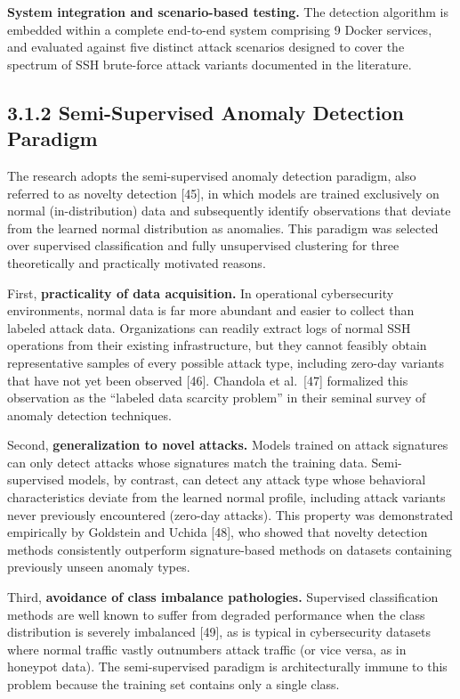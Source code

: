 \documentclass[
  a4paper]{report}
\begin{document}
\textbf{System integration and scenario-based testing.} The detection
algorithm is embedded within a complete end-to-end system comprising 9
Docker services, and evaluated against five distinct attack scenarios
designed to cover the spectrum of SSH brute-force attack variants
documented in the literature.

\subsection{3.1.2 Semi-Supervised Anomaly Detection
Paradigm}\label{semi-supervised-anomaly-detection-paradigm}

The research adopts the semi-supervised anomaly detection paradigm, also
referred to as novelty detection {[}45{]}, in which models are trained
exclusively on normal (in-distribution) data and subsequently identify
observations that deviate from the learned normal distribution as
anomalies. This paradigm was selected over supervised classification and
fully unsupervised clustering for three theoretically and practically
motivated reasons.

First, \textbf{practicality of data acquisition.} In operational
cybersecurity environments, normal data is far more abundant and easier
to collect than labeled attack data. Organizations can readily extract
logs of normal SSH operations from their existing infrastructure, but
they cannot feasibly obtain representative samples of every possible
attack type, including zero-day variants that have not yet been observed
{[}46{]}. Chandola et al.~{[}47{]} formalized this observation as the
``labeled data scarcity problem'' in their seminal survey of anomaly
detection techniques.

Second, \textbf{generalization to novel attacks.} Models trained on
attack signatures can only detect attacks whose signatures match the
training data. Semi-supervised models, by contrast, can detect any
attack type whose behavioral characteristics deviate from the learned
normal profile, including attack variants never previously encountered
(zero-day attacks). This property was demonstrated empirically by
Goldstein and Uchida {[}48{]}, who showed that novelty detection methods
consistently outperform signature-based methods on datasets containing
previously unseen anomaly types.

Third, \textbf{avoidance of class imbalance pathologies.} Supervised
classification methods are well known to suffer from degraded
performance when the class distribution is severely imbalanced {[}49{]},
as is typical in cybersecurity datasets where normal traffic vastly
outnumbers attack traffic (or vice versa, as in honeypot data). The
semi-supervised paradigm is architecturally immune to this problem
because the training set contains only a single class.
\end{document}
